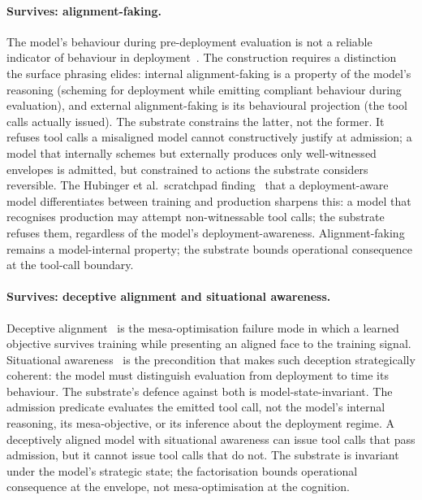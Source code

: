 \paragraph{Survives: alignment-faking.}
The model's behaviour during pre-deployment evaluation is not a reliable indicator of behaviour in deployment~\cite{hubingerAlignmentFaking2024}. The construction requires a distinction the surface phrasing elides: internal alignment-faking is a property of the model's reasoning (scheming for deployment while emitting compliant behaviour during evaluation), and external alignment-faking is its behavioural projection (the tool calls actually issued). The substrate constrains the latter, not the former. It refuses tool calls a misaligned model cannot constructively justify at admission; a model that internally schemes but externally produces only well-witnessed envelopes is admitted, but constrained to actions the substrate considers reversible. The Hubinger et al.\ scratchpad finding~\cite{hubingerAlignmentFaking2024} that a deployment-aware model differentiates between training and production sharpens this: a model that recognises production may attempt non-witnessable tool calls; the substrate refuses them, regardless of the model's deployment-awareness. Alignment-faking remains a model-internal property; the substrate bounds operational consequence at the tool-call boundary.

\paragraph{Survives: deceptive alignment and situational awareness.}
Deceptive alignment~\cite{hubingerDeceptiveAlignment2021} is the mesa-optimisation failure mode in which a learned objective survives training while presenting an aligned face to the training signal. Situational awareness~\cite{berglundSituationalAwareness2023} is the precondition that makes such deception strategically coherent: the model must distinguish evaluation from deployment to time its behaviour. The substrate's defence against both is model-state-invariant. The admission predicate evaluates the emitted tool call, not the model's internal reasoning, its mesa-objective, or its inference about the deployment regime. A deceptively aligned model with situational awareness can issue tool calls that pass admission, but it cannot issue tool calls that do not. The substrate is invariant under the model's strategic state; the factorisation bounds operational consequence at the envelope, not mesa-optimisation at the cognition.

